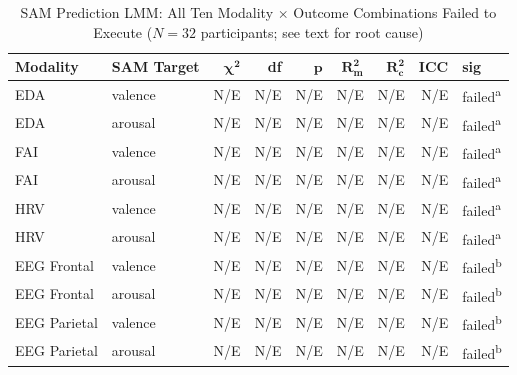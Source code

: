 \begin{table}[htbp]
    \centering
    \caption{SAM Prediction LMM: All Ten Modality $\times$ Outcome Combinations Failed to Execute ($N = 32$ participants; see text for root cause)}
    \label{tab:sam_prediction_lmm}
    \small
    \begin{tabular}{llrrrrrrl}
        \hline
        \textbf{Modality} & \textbf{SAM Target} & $\boldsymbol{\chi^2}$ & \textbf{df} & $\boldsymbol{p}$ & $\boldsymbol{R^2_m}$ & $\boldsymbol{R^2_c}$ & \textbf{ICC} & \textbf{sig} \\
        \hline
        EDA          & valence   & N/E & N/E & N/E & N/E & N/E & N/E & \multicolumn{1}{l}{failed\textsuperscript{a}} \\
        EDA          & arousal   & N/E & N/E & N/E & N/E & N/E & N/E & \multicolumn{1}{l}{failed\textsuperscript{a}} \\
        \gls{FAI}    & valence   & N/E & N/E & N/E & N/E & N/E & N/E & \multicolumn{1}{l}{failed\textsuperscript{a}} \\
        \gls{FAI}    & arousal   & N/E & N/E & N/E & N/E & N/E & N/E & \multicolumn{1}{l}{failed\textsuperscript{a}} \\
        \gls{HRV}    & valence   & N/E & N/E & N/E & N/E & N/E & N/E & \multicolumn{1}{l}{failed\textsuperscript{a}} \\
        \gls{HRV}    & arousal   & N/E & N/E & N/E & N/E & N/E & N/E & \multicolumn{1}{l}{failed\textsuperscript{a}} \\
        EEG Frontal  & valence   & N/E & N/E & N/E & N/E & N/E & N/E & \multicolumn{1}{l}{failed\textsuperscript{b}} \\
        EEG Frontal  & arousal   & N/E & N/E & N/E & N/E & N/E & N/E & \multicolumn{1}{l}{failed\textsuperscript{b}} \\
        EEG Parietal & valence   & N/E & N/E & N/E & N/E & N/E & N/E & \multicolumn{1}{l}{failed\textsuperscript{b}} \\
        EEG Parietal & arousal   & N/E & N/E & N/E & N/E & N/E & N/E & \multicolumn{1}{l}{failed\textsuperscript{b}} \\
        \hline
    \end{tabular}
    \par\vspace{4pt}

\end{table}
